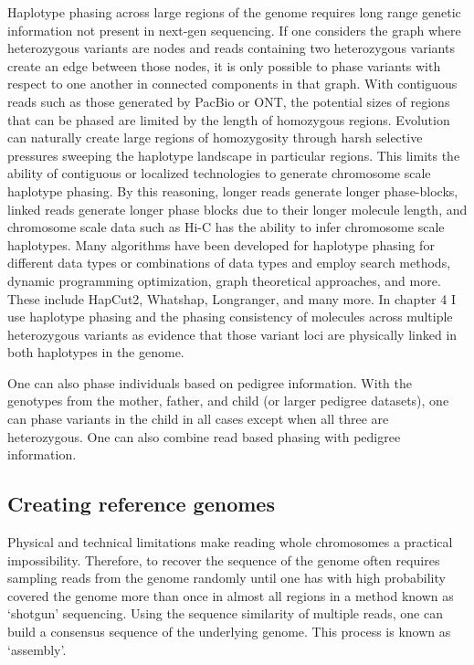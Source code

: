 \par{
Haplotype phasing across large regions of the genome requires long range genetic information not present in next-gen sequencing. If one considers the graph where heterozygous variants are nodes and reads containing two heterozygous variants create an edge between those nodes, it is only possible to phase variants with respect to one another in connected components in that graph. With contiguous reads such as those generated by PacBio or ONT, the potential sizes of regions that can be phased are limited by the length of homozygous regions. Evolution can naturally create large regions of homozygosity through harsh selective pressures sweeping the haplotype landscape in particular regions\cite{homozygosity}. This limits the ability of contiguous or localized technologies to generate chromosome scale haplotype phasing. By this reasoning, longer reads generate longer phase-blocks, linked reads generate longer phase blocks due to their longer molecule length, and chromosome scale data such as Hi-C has the ability to infer chromosome scale haplotypes\cite{falconphase}. Many algorithms have been developed for haplotype phasing for different data types or combinations of data types and employ search methods, dynamic programming optimization, graph theoretical approaches, and more. These include HapCut2\cite{hapcut2}, Whatshap\cite{whatshap}, Longranger\cite{10xlinked}, and many more. In chapter 4 I use haplotype phasing and the phasing consistency of molecules across multiple heterozygous variants as evidence that those variant loci are physically linked in both haplotypes in the genome.
} 
\par{
One can also phase individuals based on pedigree information. With the genotypes from the mother, father, and child (or larger pedigree datasets), one can phase variants in the child in all cases except when all three are heterozygous\cite{phasingreview}. One can also combine read based phasing with pedigree information\cite{Garg2016}.
}

\subsection{Creating reference genomes}

\par{
Physical and technical limitations make reading whole chromosomes a practical impossibility. Therefore, to recover the sequence of the genome often requires sampling reads from the genome randomly until one has with high probability covered the genome more than once in almost all regions\cite{LanderWaterman} in a method known as `shotgun' sequencing. Using the sequence similarity of multiple reads, one can build a consensus sequence of the underlying genome. This process is known as `assembly'.
} 

